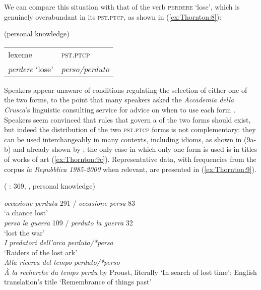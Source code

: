 \documentclass[output=paper]{langsci/langscibook}
\begin{document}
We can compare this situation with that of the verb \textsc{perdere}
`lose', which is genuinely overabundant in its \textsc{pst.ptcp}, as
shown in (\ref{ex:Thornton:8}):

\largerpage[-1]
\ea\label{ex:Thornton:8}  (personal knowledge)

\begin{tabular}{@{}ll}
lexeme & \textsc{pst.ptcp}\\

\emph{perdere} `lose' & \emph{perso\slash{}perduto}\\
\end{tabular}
\z
Speakers appear unaware of conditions regulating the selection of either
one of the two forms, to the point that many speakers asked the
\emph{Accademia della Cru\-sca}'s linguistic consulting service for advice
on when to use each form %
\citep{Thornton2016}%
%
. Speakers seem convinced that
rules that govern a  of the two forms should
exist, but indeed the distribution of the two \textsc{pst.ptcp} forms is
not complementary: they can be used interchangeably in many contexts,
including idioms, as shown in (9a-b) and already shown by %
\citet[369]{Thornton11}%
%
; the only case in which only one form is used is in titles
of works of art (\ref{ex:Thornton:9c}). Representative data, with frequencies from the
corpus \emph{la Repubblica} \emph{1985-2000} when relevant, are
presented in (\ref{ex:Thornton:9}).

\ea\label{ex:Thornton:9}  %
(%
\citealt{Thornton11}%
%
: 369, 
\citealt{Thornton2016}%
%
, personal knowledge)
%


\ea\label{ex:Thornton:9a}\emph{occasione perduta} 291 / \emph{occasione persa} 83\\ \glt `a chance lost'\\

\ex\label{ex:Thornton:9b}\emph{perso la guerra} 109 / \emph{perduto la guerra} 32\\ \glt `lost the war'\\

\ex\label{ex:Thornton:9c}\emph{I predatori dell'arca perduta\slash{}*persa}\\ \glt `Raiders of the lost ark'\\

\ex\emph{Alla ricerca del tempo perduto\slash{}*perso}\\
\glt \emph{À la recherche du
temps perdu} by Proust, literally `In search of lost time'; English translation's title `Remembrance of things past'
\end{document}
